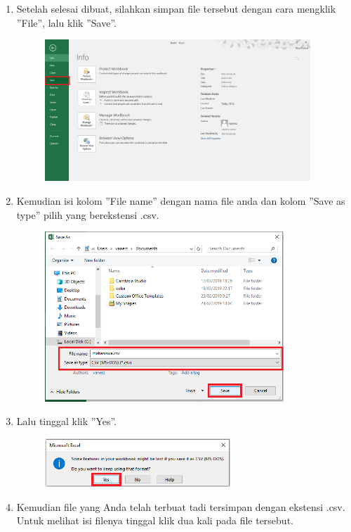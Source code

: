 \begin{enumerate}
	\item Setelah selesai dibuat, silahkan simpan file tersebut dengan cara mengklik ''File'', lalu klik ''Save''.
	
	\begin{figure}[H]
		\includegraphics[width=10cm]{figures/4/1174026/Teori/t4.png}
		\centering
	\end{figure}
	
	\item Kemudian isi kolom ''File name'' dengan nama file anda dan kolom ''Save as type'' pilih yang berekstensi .csv.
	
	\begin{figure}[H]
		\includegraphics[width=9cm]{figures/4/1174026/Teori/t5.png}
		\centering
	\end{figure}
	
	\item Lalu tinggal klik ''Yes''.
	
	\begin{figure}[H]
		\includegraphics[width=7cm]{figures/4/1174026/Teori/t6.png}
		\centering
	\end{figure}
	
	\item Kemudian file yang Anda telah terbuat tadi tersimpan dengan ekstensi .csv. Untuk melihat isi filenya tinggal klik dua kali pada file tersebut.
	

\end{enumerate}
